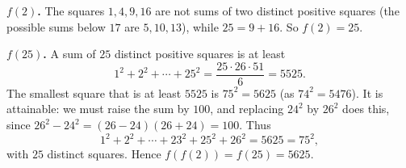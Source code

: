 \textbf{$f(2)$.} The squares $1,4,9,16$ are not sums of two distinct positive squares (the possible sums below $17$ are $5,10,13$), while $25=9+16$. So $f(2)=25$.

\textbf{$f(25)$.} A sum of $25$ distinct positive squares is at least
\[
1^2+2^2+\cdots+25^2=\dfrac{25\cdot26\cdot51}{6}=5525 .
\]
The smallest square that is at least $5525$ is $75^2=5625$ (as $74^2=5476$). It is attainable: we must raise the sum by $100$, and replacing $24^2$ by $26^2$ does this, since $26^2-24^2=(26-24)(26+24)=100$. Thus
\[
1^2+2^2+\cdots+23^2+25^2+26^2=5625=75^2 ,
\]
with $25$ distinct squares. Hence $f(f(2))=f(25)=\boxed{5625}$.
